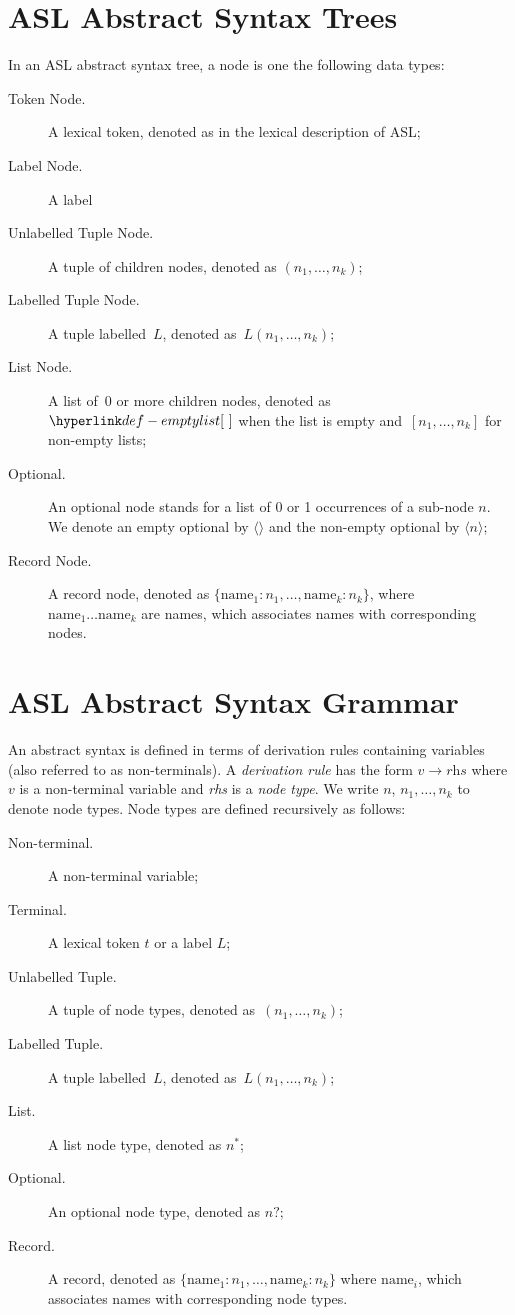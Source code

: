 \documentclass{book}
\newcommand\derives[0]{\longrightarrow}
\begin{document}
\section{ASL Abstract Syntax Trees \label{sec:ASLAbstractSyntaxTrees}}

In an ASL abstract syntax tree, a node is one the following data types:
\begin{description}
\item[Token Node.] A lexical token, denoted as in the lexical description of ASL;
\item[Label Node.] A label
\item[Unlabelled Tuple Node.] A tuple of children nodes, denoted as $(n_1,\ldots,n_k)$;
\item[Labelled Tuple Node.] A tuple labelled~$L$, denoted as~$L(n_1,\ldots,n_k)$;
\item[List Node.] A list of~$0$ or more children nodes, denoted as~$\emptylist$
      when the list is empty and~$[n_1,\ldots,n_k]$ for non-empty lists;
\item[Optional.] An optional node stands for a list of 0 or 1 occurrences of a sub-node $n$. We denote an empty optional by $\langle\rangle$ and the non-empty optional by $\langle n \rangle$;
\item[Record Node.] A record node, denoted as $\{\text{name}_1 : n_1,\ldots,\text{name}_k : n_k\}$, where \\
      $\text{name}_1 \ldots \text{name}_k$ are names, which associates names with corresponding nodes.
\end{description}

\newpage

\section{ASL Abstract Syntax Grammar \label{sec:ASLAbstractSyntaxGrammar}}

An abstract syntax is defined in terms of derivation rules containing variables (also referred to as non-terminals).
%
A \emph{derivation rule} has the form $v \derives \textit{rhs}$ where $v$ is a non-terminal variable and \textit{rhs} is a \emph{node type}. We write $n$, $n_1,\ldots,n_k$ to denote node types.
%
Node types are defined recursively as follows:
\begin{description}
\item[Non-terminal.] A non-terminal variable;
\item[Terminal.] A lexical token $t$ or a label $L$;
\item[Unlabelled Tuple.] A tuple of node types, denoted as~$(n_1,\ldots,n_k)$;
\item[Labelled Tuple.] A tuple labelled~$L$, denoted as~$L(n_1,\ldots,n_k)$;
\item[List.] A list node type, denoted as $n^{*}$;
\item[Optional.] An optional node type, denoted as $n?$;
\item[Record.] A record, denoted as $\{\text{name}_1 : n_1,\ldots,\text{name}_k : n_k\}$ where $\text{name}_i$, which associates names with corresponding node types.
\end{description}
\end{document}
